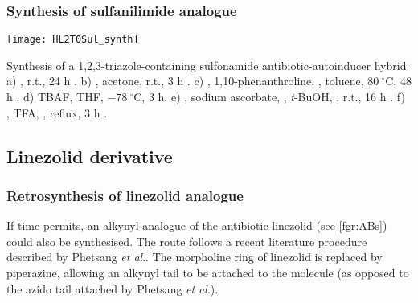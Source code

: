 \subsubsection{Synthesis of sulfanilimide analogue }

\begin{scheme}[H]
	\begin{center}
		\texttt{[image: HL2T0Sul\_synth]}
		\caption{Synthesis of a 1,2,3-triazole-containing sulfonamide antibiotic-autoinducer hybrid.
		a) , r.t., 24 h \cite{Bendikov2005}. 
		b) , acetone, r.t., 3 h \cite{Graux2014}. 
		c) , 1,10-phenanthroline, , toluene, $80\ ^{\circ}$C, 48 h \cite{Graux2014}. 
		d) TBAF, THF, $-78\ ^{\circ}$C, 3 h\cite{Graux2014}. 
		e) , sodium ascorbate, , \textit{t}-BuOH, , r.t., 16 h \cite{IJsselstijn2006}. 
		f) , TFA, , reflux, 3 h \cite{Bissinger2011, Reuillon2012}.
		\label{sch:HL2T0Sul_synth}}
	\end{center}
\end{scheme}


\subsection{Linezolid derivative}

\subsubsection{Retrosynthesis of linezolid analogue }

If time permits, an alkynyl analogue of the antibiotic linezolid  (see \ref{fgr:ABs}) could also be synthesised. The route follows a recent literature procedure described by Phetsang \textit{et al}.\cite{Phetsang2014}. The morpholine ring of linezolid is replaced by piperazine, allowing an alkynyl tail to be attached to the molecule (as opposed to the azido tail attached by Phetsang \textit{et al}.).

